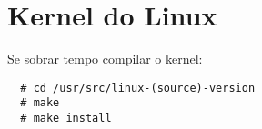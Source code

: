 
\section*{Kernel do Linux}

Se sobrar tempo compilar o kernel:

\begin{lstlisting}
  # cd /usr/src/linux-(source)-version
  # make
  # make install
\end{lstlisting}
